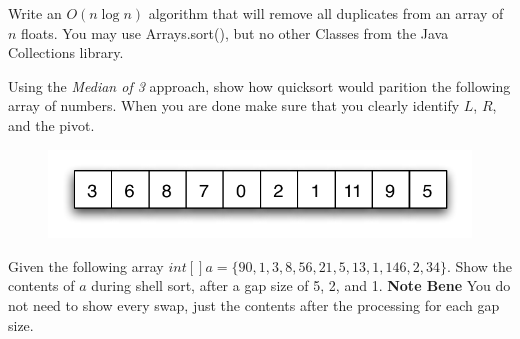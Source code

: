 \documentclass[11pt,letter]{exam}
\begin{document}
\begin{questions}


\newpage
\question[20] 
  Write an 
  $O(n \log{n})$ algorithm that will remove all duplicates from an
  array of $n$ floats.  You may use Arrays.sort(), but no other Classes
  from the Java Collections library.
\vspace{4.5in}

\newpage
\question[10] Using the \textit{Median of 3} approach, show how
quicksort would parition the following array of numbers.  When you are
done make sure that you clearly identify $L$, $R$, and the pivot.
\begin{figure}[h]
  \centering
  \includegraphics{part-array.pdf}
\end{figure}

\newpage \question[10] Given the following array $int[] a = \{ 90, 1,
3, 8, 56, 21, 5, 13, 1, 146, 2, 34\}$.  Show the contents of $a$
during shell sort, after a gap size of 5, 2, and 1.  \textbf{Note
  Bene} You do not need to show every swap, just the contents after
the processing for each gap size.


\end{questions}
\end{document}
